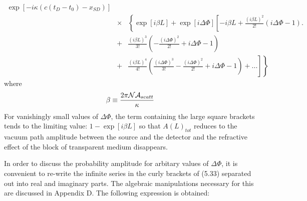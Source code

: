 {\begin{eqnarray}
   \exp\left[ - i \kappa\left(c(t_D-t_0)-x_{SD}\right)\right] \nonumber \\
        & \times & \left\{ \exp[i\beta L] + \exp[i\Delta \Phi]\left[ -i\beta L +
       \frac{(i\beta L)^2}{2!}\left(i\Delta \Phi-1\right).\right.\right. \nonumber \\
        & + & \frac{(i\beta L)^3}{3!}\left(-\frac{(i\Delta \Phi)^2}{2!}
        + i\Delta \Phi-1\right)  \nonumber \\
        & + & \left .\left .  \frac{(i\beta L)^4}{4!} \left(\frac{(i\Delta \Phi)^3}{3!}
         -\frac{(i\Delta \Phi)^2}{2!} 
        + i\Delta \Phi-1\right)+ ...  \right] \right \}
   \end{eqnarray}
      where 
      \begin{equation}
      \beta \equiv \frac{ 2 \pi {\cal N}{\cal A}_{scatt}}{\kappa}
  \end{equation}
    For vanishingly small values of $\Delta \Phi$,
    the term containing the large square brackets tends to the limiting value:
    $1-\exp[i\beta L]$ so that $ A(L)_{tot}$ reduces to the vacuum path amplitude
    between the source and the detector and the refractive effect of the block of
    transparent medium disappears.
    \par In order to discuss the probability amplitude  for arbitary values of
   $\Delta \Phi$, it is convenient to re-write the infinite series in the curly
   brackets of (5.33) separated out into real and imaginary parts. The algebraic manipulations
   necessary for this are discussed in Appendix D. The following expression
   is obtained:
    
}
